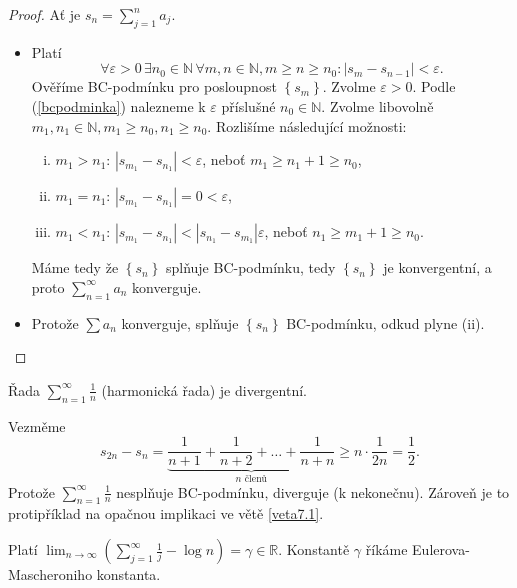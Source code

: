 \begin{proof}
	Ať je $s_n = \sum_{j = 1}^n a_j$.
	\begin{itemize}
		\item[$\impliedby$] Platí
		\begin{equation}\label{bcpodminka}
		\forall \varepsilon > 0 \, \exists n_0 \in \mathbb N \, \forall m, n \in \mathbb N , m \geq n \geq n_0: |s_m - s_{n-1}| < \varepsilon.
\end{equation}
		Ověříme BC-podmínku pro posloupnost $\left \{ s_m \right \} $. Zvolme $\varepsilon > 0$. Podle
		(\ref{bcpodminka}) nalezneme k $\varepsilon$ příslušné $n_0\in \mathbb N $. Zvolme
		libovolně $m_1, n_1 \in \mathbb N , m_1 \geq n_0, n_1 \geq n_0$. Rozlišíme následující možnosti:
		\begin{enumerate}[(i)]
			\item $m_1 > n_1$: $|s_{m_1} - s_{n_1}|< \varepsilon $, neboť $m_1 \geq n_1 + 1 \geq n_0$,
			\item $m_1 = n_1$: $|s_{m_1} - s_{n_1}| = 0 < \varepsilon$,
			\item $m_1 < n_1$: $|s_{m_1} - s_{n_1}| < |s_{n_1} - s_{m_1}|\varepsilon $, neboť $n_1 \geq m_1 + 1 \geq n_0$.
		\end{enumerate}
		Máme tedy že $\left \{ s_n \right \} $ splňuje BC-podmínku, tedy $\left \{ s_n \right \} $ je konvergentní,
		a proto $\sum_{n=1}^\infty a_n$ konverguje.
		\item[$\implies$] Protože $\sum a_n$ konverguje, splňuje $\left \{ s_n \right \} $ BC-podmínku, odkud plyne (ii).\qedhere
	\end{itemize}
\end{proof}

\begin{priklad}
    Řada $\sum_{n=1}^\infty \frac{1}{n}$ (harmonická řada) je divergentní.
    \par Vezměme
    $$
    s_{2n}-s_n=\underbrace{\frac{1}{n+1} + \frac{1}{n+2}+ \dots + \frac{1}{n+n}}_{n \textrm{ členů}} \geq n \cdot \frac{1}{2n} = \frac{1}{2}.
    $$
    Protože $\sum_{n=1}^\infty \frac{1}{n}$ nesplňuje BC-podmínku,  diverguje (k nekonečnu).
    Zároveň je to protipříklad na opačnou implikaci ve větě \ref{veta7.1}.
\end{priklad}

\begin{poznamka}
	Platí $\lim_{n \to \infty} \left( \sum_{j=1}^\infty \frac{1}{j} - \log n \right ) = \gamma \in \mathbb R  $.
	Konstantě $\gamma$ říkáme Eulerova-Mascheroniho konstanta.
\end{poznamka}


